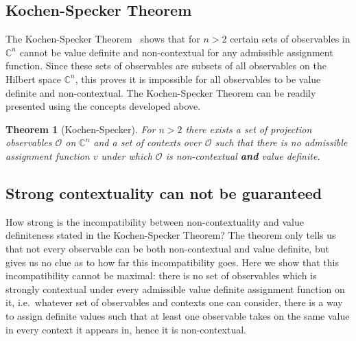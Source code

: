 \documentclass[11pt, a4paper]{article}
\newtheorem{Theorem}{Theorem}
\newtheorem{Fact}[Theorem]{Fact}
\theoremstyle{definition}
\begin{document}
%	


\subsection{Kochen-Specker Theorem}

The Kochen-Specker Theorem~\cite{kochen1} shows that for $n>2$ certain sets of observables in $\mathbb{C}^n$
cannot be value definite and non-contextual for any admissible assignment function. Since these sets of observables are subsets of all observables on the Hilbert space $\mathbb{C}^n$, this proves it is impossible for all observables to be value definite and non-contextual. The Kochen-Specker Theorem can be readily presented using the concepts developed above.\\

\begin{Theorem}[Kochen-Specker]
	For $n>2$ there exists a set of projection observables $\mathcal{O}$ on $\mathbb{C}^n$ and a set of contexts over $\mathcal{O}$ such that there is no admissible assignment function $v$ under which $\mathcal{O}$ is non-contextual \textbf{and} value definite.
\end{Theorem}

\subsection{Strong contextuality can not be guaranteed}

How strong is the incompatibility between non-contextuality and value definiteness stated in the Kochen-Specker Theorem?
The theorem only tells us that not every observable can be both non-contextual and value definite, but gives us no clue as to how far this incompatibility goes.
Here we show that this incompatibility cannot be maximal: there is no set of observables which is strongly contextual under every admissible value definite assignment function on it,
i.e.\  whatever set of observables and contexts one can consider, there is a way to assign definite values such that at least one observable takes on the same value in every context it appears in, hence it is non-contextual. \\
\end{document}
